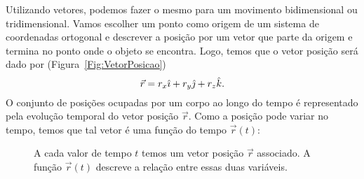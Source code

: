Utilizando vetores, podemos fazer o mesmo para um movimento bidimensional ou tridimensional. Vamos escolher um ponto como origem de um sistema de coordenadas ortogonal e descrever a posição por um vetor que parte da origem e termina no ponto onde o objeto se encontra. Logo, temos que o vetor posição será dado por (Figura~\ref{Fig:VetorPosicao})
\begin{equation}
  \vec{r} = r_x \hat{\imath} + r_y \hat{\jmath} + r_z \hat{k}.
\end{equation}
%
O conjunto de posições ocupadas por um corpo ao longo do tempo é representado pela evolução temporal do vetor posição $\vec{r}$. Como a posição pode variar no tempo, temos que tal vetor é uma função do tempo $\vec{r}(t)$:
\begin{figure}
\centering
{}
\caption{A cada valor de tempo $t$ temos um vetor posição $\vec{r}$ associado. A função $\vec{r}(t)$ descreve a relação entre essas duas variáveis.}
\end{figure}

